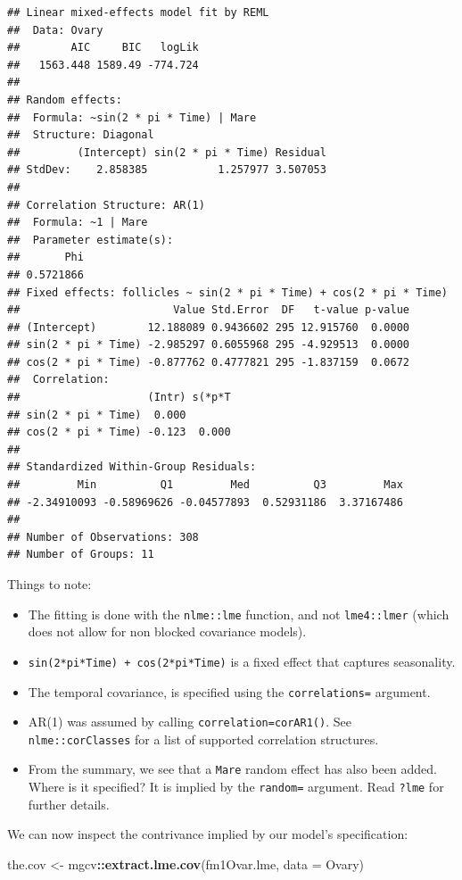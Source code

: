 \documentclass[]{book}
\newenvironment{Shaded}{\begin{snugshade}}{\end{snugshade}}
\newcommand{\DataTypeTok}[1]{\textcolor[rgb]{0.13,0.29,0.53}{#1}}
\newcommand{\KeywordTok}[1]{\textcolor[rgb]{0.13,0.29,0.53}{\textbf{#1}}}
\newcommand{\NormalTok}[1]{#1}
\newcommand{\OperatorTok}[1]{\textcolor[rgb]{0.81,0.36,0.00}{\textbf{#1}}}
\newcommand{\StringTok}[1]{\textcolor[rgb]{0.31,0.60,0.02}{#1}}
\providecommand{\tightlist}{%
  \setlength{\itemsep}{0pt}\setlength{\parskip}{0pt}}
\theoremstyle{definition}
\theoremstyle{definition}
\theoremstyle{definition}
\theoremstyle{remark}
\begin{document}
\begin{verbatim}
## Linear mixed-effects model fit by REML
##  Data: Ovary 
##        AIC     BIC   logLik
##   1563.448 1589.49 -774.724
## 
## Random effects:
##  Formula: ~sin(2 * pi * Time) | Mare
##  Structure: Diagonal
##         (Intercept) sin(2 * pi * Time) Residual
## StdDev:    2.858385           1.257977 3.507053
## 
## Correlation Structure: AR(1)
##  Formula: ~1 | Mare 
##  Parameter estimate(s):
##       Phi 
## 0.5721866 
## Fixed effects: follicles ~ sin(2 * pi * Time) + cos(2 * pi * Time) 
##                        Value Std.Error  DF   t-value p-value
## (Intercept)        12.188089 0.9436602 295 12.915760  0.0000
## sin(2 * pi * Time) -2.985297 0.6055968 295 -4.929513  0.0000
## cos(2 * pi * Time) -0.877762 0.4777821 295 -1.837159  0.0672
##  Correlation: 
##                    (Intr) s(*p*T
## sin(2 * pi * Time)  0.000       
## cos(2 * pi * Time) -0.123  0.000
## 
## Standardized Within-Group Residuals:
##         Min          Q1         Med          Q3         Max 
## -2.34910093 -0.58969626 -0.04577893  0.52931186  3.37167486 
## 
## Number of Observations: 308
## Number of Groups: 11
\end{verbatim}

Things to note:

\begin{itemize}
\tightlist
\item
  The fitting is done with the \texttt{nlme::lme} function, and not \texttt{lme4::lmer} (which does not allow for non blocked covariance models).
\item
  \texttt{sin(2*pi*Time)\ +\ cos(2*pi*Time)} is a fixed effect that captures seasonality.
\item
  The temporal covariance, is specified using the \texttt{correlations=} argument.
\item
  AR(1) was assumed by calling \texttt{correlation=corAR1()}. See \texttt{nlme::corClasses} for a list of supported correlation structures.
\item
  From the summary, we see that a \texttt{Mare} random effect has also been added. Where is it specified? It is implied by the \texttt{random=} argument. Read \texttt{?lme} for further details.
\end{itemize}

We can now inspect the contrivance implied by our model's specification:

\begin{Shaded}
\begin{Highlighting}[]
\NormalTok{the.cov <-}\StringTok{ }\NormalTok{mgcv}\OperatorTok{::}\KeywordTok{extract.lme.cov}\NormalTok{(fm1Ovar.lme, }\DataTypeTok{data =}\NormalTok{ Ovary) }
\end{Highlighting}
\end{Shaded}
\end{document}

